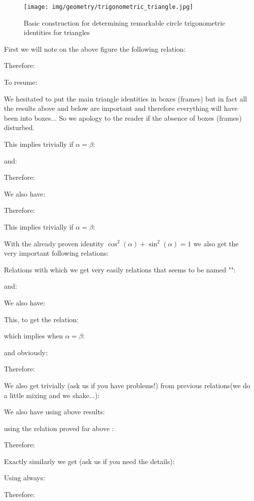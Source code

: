 \begin{figure}[H]
\centering
\texttt{[image: img/geometry/trigonometric\_triangle.jpg]}
\caption{Basic construction for determining remarkable circle trigonometric identities for triangles}
\end{figure}

	First we will note on the above figure the following relation:
	
	Therefore:
	
	To resume:
	
	\begin{tcolorbox}[title=Remark,colframe=black,arc=10pt]
	We hesitated to put the main triangle identities in boxes (frames) but in fact all the results above and below are important and therefore everything will have been into boxes... So we apology to the reader if the absence of boxes (frames) disturbed.
	\end{tcolorbox}
	This implies trivially if $\alpha=\beta$:
	
	and:
	
	Therefore:
	
	We also have:
	
	Therefore:
	
	This implies trivially if $\alpha=\beta$:
	
	With the already proven identity $\cos^2(\alpha)+\sin^2(\alpha)=1$ we also get the very important following relations:
	
	Relations with which we get very easily relations that seems to be named "":
	
	and: 
	
	We also have:
	
	This, to get the relation:
	
	which implies when $\alpha=\beta$:
	
	and obviously:
	
	Therefore:
	
	We also get trivially (ask us if you have problems!) from previous relations(we do a little mixing and we shake...):
	
	We also have using above results:
	
	using the relation proved far above :
	
	Therefore:
	
	Exactly similarly we get (ask us if you need the details):
	
	Using always:
	
	Therefore:
	
